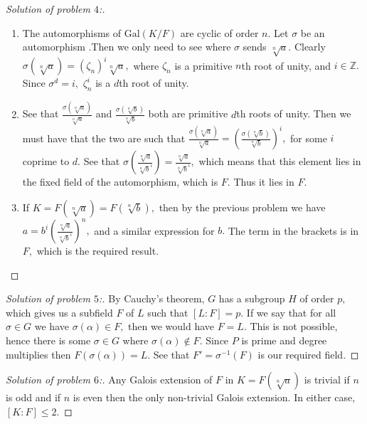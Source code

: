 \documentclass[letterpaper,11pt,twoside]{article}
\theoremstyle{proposition}
\theoremstyle{definition}
\theoremstyle{theorem}
\theoremstyle{definition}
\theoremstyle{definition}
\theoremstyle{definition}
\theoremstyle{lemma}
\theoremstyle{definition}
\theoremstyle{definition}
\theoremstyle{corollary}
\theoremstyle{definition}
\theoremstyle{definition}
\theoremstyle{definition}
\begin{document}
	\begin{proof}[Solution of problem $4$:]
		\begin{enumerate}
			\item The automorphisms of $\text{Gal}(K/F)$ are cyclic of order $n.$ Let $\sigma$ be an automorphism .Then we only need to see where $\sigma$ 
			sends $\sqrt[n]{a}.$ Clearly $\sigma( \sqrt[n]{a} )= (\zeta_n)^i \sqrt[n]{a},$ where $\zeta_n$ is a primitive $n$th root of unity, and $i \in 
			\mathbb{Z}.$ Since $\sigma^d = i,$ $\zeta_n^i$ is a $d$th root of unity.
			\item See that $ \frac{\sigma(\sqrt[n]{a})}{\sqrt[n]{a}}$ and $\frac{\sigma(\sqrt[n]{b})}{\sqrt[n]{b}}$ both are primitive $d$th roots of unity. 
			Then we must have that the two are such that  $ \frac{\sigma(\sqrt[n]{a})}{\sqrt[n]{a}}= 
			\left(\frac{\sigma(\sqrt[n]{b})}{\sqrt[n]{b}}\right)^i,$ for some $i $ coprime to $d.$ See that $ \sigma \left( 
			\frac{\sqrt[n]{a}}{\sqrt[n]{b}^i} \right)= \frac{\sqrt[n]{a}}{\sqrt[n]{b}^i},$ which means that this element lies in the fixed field of the 
			automorphism, which is $F.$ Thus it lies in $F.$ 
		
			\item If $K=F(\sqrt[n]{a})=F(\sqrt[n]{b}),$ then by the previous problem we have $a= b^i \left( \frac{\sqrt[n]{a}}{\sqrt[n]{b}^i} \right)^n,$ 
			and a similar expression for $b.$ The term in the brackets is in $F,$ which is the required result.
		\end{enumerate}
	\end{proof}
	\begin{proof}[Solution of problem $5$:]
		By Cauchy's theorem, $G$ has a subgroup $H$ of order $p,$ which gives us a subfield $F$ of $L$ such that $[L:F]=p.$ If we say that for all $\sigma 
		\in G$ we have $\sigma(\alpha) \in F,$ then we would have $F=L.$ This is not possible, hence there is some $\sigma \in G$ where $\sigma(\alpha) 
		\notin F.$ Since $P$ is prime and degree multiplies then $F(\sigma(\alpha))=L.$ See that $F'= \sigma^{-1}(F)$ is our required field.  
	\end{proof}
	\begin{proof}[Solution of problem $6$:]
		Any Galois extension of $F$ in $K=F(\sqrt[n]{a})$ is trivial if $n$ is odd and if $n$ is even then the only non-trivial Galois extension. In either 
		case, $[K:F] \leq 2.$ 
	\end{proof}
\end{document}
